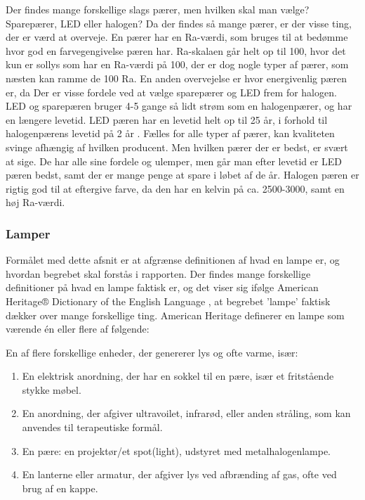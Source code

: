 Der findes mange forskellige slags pærer, men hvilken skal man vælge? Sparepærer, LED eller halogen?
Da der findes så mange pærer, er der visse ting, der er værd at overveje. En pærer har en Ra-værdi, som bruges til at bedømme hvor god en farvegengivelse pæren har. Ra-skalaen går helt op til 100, hvor det kun er sollys som har en Ra-værdi på 100, der er dog nogle typer af pærer, som næsten kan ramme de 100 Ra.\cite{halogen_paere}
En anden overvejelse er hvor energivenlig pæren er, da 
Der er visse fordele ved at vælge sparepærer og LED frem for halogen. LED og sparepæren bruger 4-5 gange så lidt strøm som en halogenpærer, og har en længere levetid. LED pæren \cite{LED} har en levetid helt op til 25 år, i forhold til halogenpærens levetid på 2 år \cite{vaelg_paere}.
Fælles for alle typer af pærer, kan kvaliteten svinge afhængig af hvilken producent. Men hvilken pærer der er bedst, er svært at sige. De har alle sine fordele og ulemper, men går man efter levetid er LED pæren bedst, samt der er mange penge at spare i løbet af de år. Halogen pæren er rigtig god til at eftergive farve, da den har en kelvin på ca. 2500-3000, samt en høj Ra-værdi.


\subsubsection{Lamper}
Formålet med dette afsnit er at afgrænse definitionen af hvad en lampe er, og hvordan begrebet skal forstås i rapporten.
Der findes mange forskellige definitioner på hvad en lampe faktisk er, og det viser sig ifølge American Heritage® Dictionary of the English Language \cite{american_heritage}, at begrebet ’lampe’ faktisk dækker over mange forskellige ting. American Heritage definerer en lampe som værende én eller flere af følgende:

En af flere forskellige enheder, der genererer lys og ofte varme, især:
\begin{enumerate}
    \item En elektrisk anordning, der har en sokkel til en pære, især et fritstående stykke møbel.
    \item En anordning, der afgiver ultravoilet, infrarød, eller anden stråling, som kan anvendes til terapeutiske formål.
    \item En pære: en projektør/et spot(light), udstyret med metalhalogenlampe.
    \item En lanterne eller armatur, der afgiver lys ved afbrænding af gas, ofte ved brug af en kappe.
\end{enumerate}

